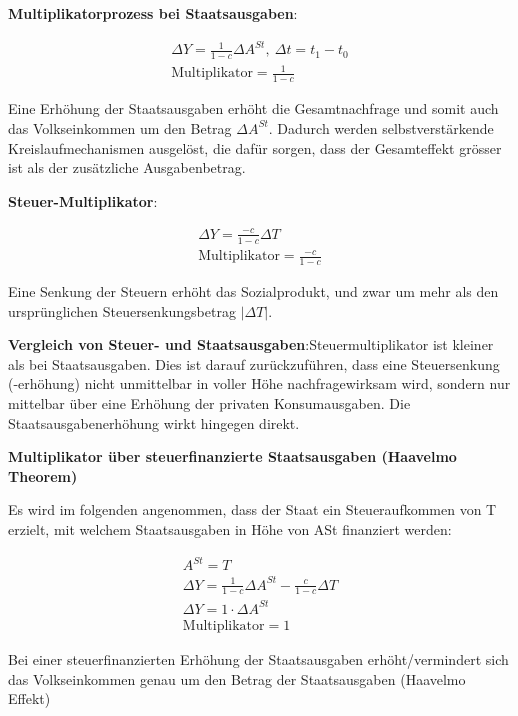 \documentclass[9pt, landscape, fleqn]{scrartcl}
\begin{document}
\begin{multicols*}{3}
\textbf{Multiplikatorprozess bei Staatsausgaben}: 

\begin{align}
    \Delta Y = \frac{1}{1-c} \Delta A^{St}, ~\Delta t = t_1-t_0 \\
    \text{Multiplikator} = \frac{1}{1-c}
\end{align}

Eine Erhöhung der Staatsausgaben erhöht die Gesamtnachfrage und somit auch das Volkseinkommen um den Betrag $\Delta A^{St}$. Dadurch werden selbstverstärkende Kreislaufmechanismen ausgelöst, die dafür sorgen, dass der Gesamteffekt grösser ist als der zusätzliche Ausgabenbetrag. \newline

\textbf{Steuer-Multiplikator}: 

\begin{align}
    \Delta Y = \frac{-c}{1-c} \Delta T \\
    \text{Multiplikator} = \frac{-c}{1-c}
\end{align}

Eine Senkung der Steuern erhöht das Sozialprodukt, und zwar um mehr als den ursprünglichen Steuersenkungsbetrag $ |\Delta T|$. \newline

\textbf{Vergleich von Steuer- und Staatsausgaben}:Steuermultiplikator ist kleiner als bei Staatsausgaben. Dies ist darauf zurückzuführen, dass eine Steuersenkung (-erhöhung) nicht unmittelbar in voller Höhe nachfragewirksam wird, sondern nur mittelbar über eine Erhöhung der privaten Konsumausgaben. Die Staatsausgabenerhöhung wirkt hingegen direkt. \newline 

\textbf{Multiplikator über steuerfinanzierte Staatsausgaben (Haavelmo Theorem)}

Es wird im folgenden angenommen, dass der Staat ein Steueraufkommen von T erzielt, mit welchem Staatsausgaben in Höhe von ASt finanziert werden: 

\begin{align}
    A^{St} = T \\
    \Delta Y = \frac{1}{1-c} \Delta A^{St} - \frac{c}{1-c} \Delta T \\
    \Delta Y = 1\cdot \Delta A^{St} \\
    \text{Multiplikator} = 1
\end{align}

Bei einer steuerfinanzierten Erhöhung der Staatsausgaben erhöht/vermindert sich das Volkseinkommen genau um den Betrag der Staatsausgaben (Haavelmo Effekt)


\end{multicols*}
\end{document}
